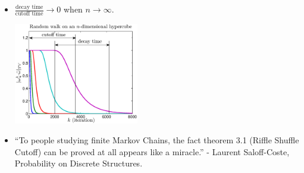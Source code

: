 \documentclass[12pt,t]{beamer}
\begin{document}
\begin{frame}
  \begin{itemize}
  \item $\frac{\text{decay time}}{\text{cutoff time}} \rightarrow 0$ when $n \rightarrow \infty$. 
   \begin{center}
   \includegraphics[width=0.43\textwidth,trim=1cm 1cm 0cm 0cm]{bntncutoff}
   \end{center}
  \vspace{0.2cm}
   \item ``To people studying finite Markov Chains, the fact theorem 3.1 (Riffle Shuffle Cutoff) can be proved at all appears like a miracle.'' - Laurent Saloff-Coste, Probability on Discrete Structures.
\end{itemize}
\end{frame}
\end{document}
